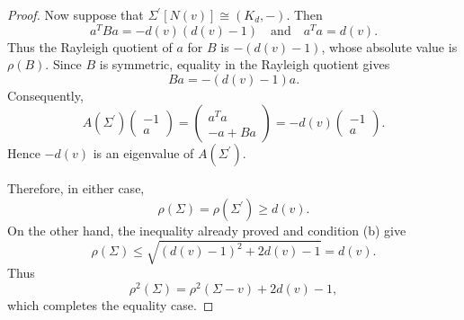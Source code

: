 \documentclass[12pt]{article}
\theoremstyle{plain}
\numberwithin{equation}{section}
\begin{document}
\begin{proof}
		Now suppose that $\Sigma^\prime[N(v)]\cong(K_d,-)$. Then
		\[ a^TBa=-d(v)(d(v)-1) \quad\text{and}\quad a^Ta=d(v). \]
		Thus the Rayleigh quotient of $a$ for $B$ is $-(d(v)-1)$, whose absolute value is $\rho(B)$. Since $B$ is symmetric, equality in the Rayleigh quotient gives
		\[ Ba=-(d(v)-1)a. \]
		Consequently,
		\[
		A(\Sigma^\prime)
		\begin{pmatrix}
			-1\\
			a
		\end{pmatrix}
		=
		\begin{pmatrix}
			a^Ta\\
			-a+Ba
		\end{pmatrix}
		=-d(v)
		\begin{pmatrix}
			-1\\
			a
		\end{pmatrix}.\]
		Hence $-d(v)$ is an eigenvalue of $A(\Sigma^\prime)$.
		
		Therefore, in either case,
		\[ \rho(\Sigma)=\rho(\Sigma^\prime)\geq d(v). \]
		On the other hand, the inequality already proved and condition (b) give
		\[ \rho(\Sigma) \leq \sqrt{(d(v)-1)^2+2d(v)-1} =d(v).\]
		Thus
		\[\rho^2(\Sigma)=\rho^2(\Sigma-v)+2d(v)-1,\]
		which completes the equality case.
	\end{proof}
	
\end{document}
